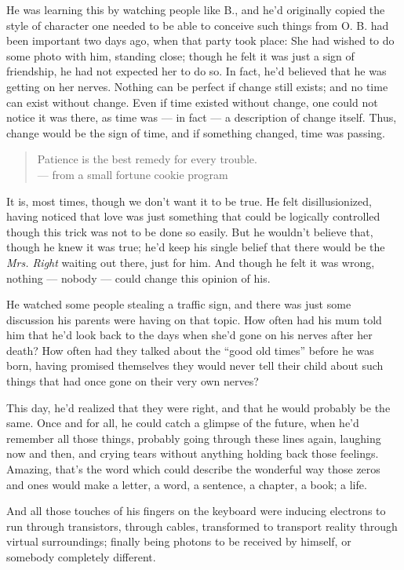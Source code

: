 He was learning this by watching people like B., and he'd originally copied the style of character one needed to be able to conceive such things from O. B. had been important two days ago, when that party took place: She had wished to do some photo with him, standing close; though he felt it was just a sign of friendship, he had not expected her to do so. In fact, he'd believed that he was getting on her nerves. 
Nothing can be perfect if change still exists; and no time can exist without change. Even if time existed without change, one could not notice it was there, as time was --- in fact --- a description of change itself. Thus, change would be the sign of time, and if something changed, time was passing.
\begin{quote}
Patience is the best remedy for every trouble.\\
--- from a small fortune cookie program
\end{quote}
It is, most times, though we don't want it to be true. 
He felt disillusionized, having noticed that love was just something that could be logically controlled though this trick was not to be done so easily. But he wouldn't believe that, though he knew it was true; he'd keep his single belief that there would be the \emph{Mrs. Right} waiting out there, just for him. And though he felt it was wrong, nothing --- nobody --- could change this opinion of his.

He watched some people stealing a traffic sign, and there was just some discussion his parents were having on that topic. How often had his mum told him that he'd look back to the days when she'd gone on his nerves after her death? How often had they talked about the \enquote{good old times} before he was born, having promised themselves they would never tell their child about such things that had once gone on their very own nerves?

This day, he'd realized that they were right, and that he would probably be the same. Once and for all, he could catch a glimpse of the future, when he'd remember all those things, probably going through these lines again, laughing now and then, and crying tears without anything holding back those feelings. Amazing, that's the word which could describe the wonderful way those zeros and ones would make a letter, a word, a sentence, a chapter, a book; a life.

And all those touches of his fingers on the keyboard were inducing electrons to run through transistors, through cables, transformed to transport reality through virtual surroundings; finally being photons to be received by himself, or somebody completely different.

